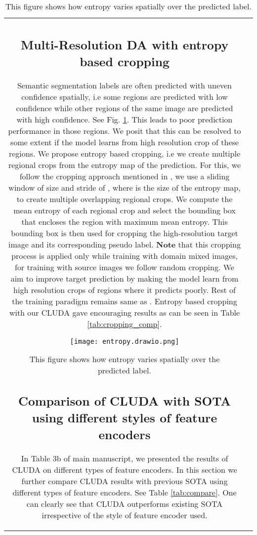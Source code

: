 \documentclass{article}
\begin{document}
\begin{table}[h]
{\begin{tabular}{@{}cc@{}}
\subsection{Multi-Resolution DA with entropy based cropping}\label{subsec:entropy_crop}
Semantic segmentation labels are often predicted with uneven confidence spatially, i.e some regions are predicted with low confidence while other regions of the same image are predicted with high confidence. See Fig. \ref{fig:entropy_pred}. This leads to poor prediction performance in those regions. We posit that this can be resolved to some extent if the model learns from high resolution crop of these regions. We propose entropy based cropping, i.e we create multiple regional crops from the entropy map of the prediction. For this, we follow the cropping approach mentioned in \cite{hoyer2022hrda}, we use a sliding window of size  and stride of , where  is the size of the entropy map, to create multiple overlapping regional crops. We compute the mean entropy of each regional crop and select the bounding box that encloses the region with maximum mean entropy. This bounding box is then used for cropping the high-resolution target image and its corresponding pseudo label. \textbf{Note} that this cropping process is applied only while training with domain mixed images, for training with source images we follow random cropping. We aim to improve target prediction by making the model learn from high resolution crops of regions where it predicts poorly. Rest of the training paradigm remains same as \cite{hoyer2022hrda}. Entropy based cropping with our CLUDA gave encouraging results as can be seen in Table \ref{tab:cropping_comp}.

\begin{figure}
    \centering
    \texttt{[image: entropy.drawio.png]}
    \caption{This figure shows how entropy varies spatially over the predicted label.}
    \label{fig:entropy_pred}
\end{figure}

\subsection{Comparison of CLUDA with SOTA using different styles of feature encoders}\label{sec:compare}
In Table 3b of main manuscript, we presented the results of CLUDA on different types of feature encoders. In this section we further compare CLUDA results with previous SOTA using different types of feature encoders. See Table \ref{tab:compare}. One can clearly see that CLUDA outperforms existing SOTA irrespective of the style of feature encoder used.


\end{tabular}}
\end{table}
\end{document}
